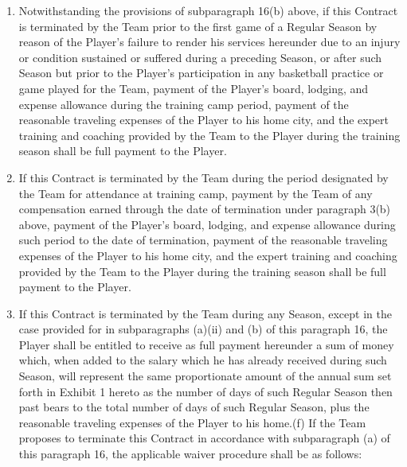 \documentclass[
]{book}
\begin{document}
\begin{enumerate}
\begin{enumerate}
  \item
    Notwithstanding the provisions of subparagraph 16(b) above, if this Contract is terminated by the Team prior to the first game of a Regular Season by reason of the Player's failure to render his services hereunder due to an injury or condition sustained or suffered during a preceding Season, or after such Season but prior to the Player's participation in any basketball practice or game played for the Team, payment of the Player's board, lodging, and expense allowance during the training camp period, payment of the reasonable traveling expenses of the Player to his home city, and the expert training and coaching provided by the Team to the Player during the training season shall be full payment to the Player.
  \item
    If this Contract is terminated by the Team during the period designated by the Team for attendance at training camp, payment by the Team of any compensation earned through the date of termination under paragraph 3(b) above, payment of the Player's board, lodging, and expense allowance during such period to the date of termination, payment of the reasonable traveling expenses of the Player to his home city, and the expert training and coaching provided by the Team to the Player during the training season shall be full payment to the Player.
  \item
    If this Contract is terminated by the Team during any Season, except in the case provided for in subparagraphs (a)(ii) and (b) of this paragraph 16, the Player shall be entitled to receive as full payment hereunder a sum of money which, when added to the salary which he has already received during such Season, will represent the same proportionate amount of the annual sum set forth in Exhibit 1 hereto as the number of days of such Regular Season then past bears to the total number of days of such Regular Season, plus the reasonable traveling expenses of the Player to his home.(f) If the Team proposes to terminate this Contract in accordance with subparagraph (a) of this paragraph 16, the applicable waiver procedure shall be as follows:


\end{enumerate}
\end{enumerate}
\end{document}
